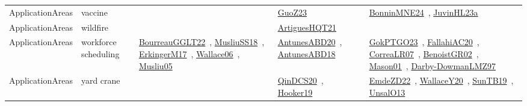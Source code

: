 {\begin{longtable}{lp{3cm}>{\raggedright\arraybackslash}p{6cm}>{\raggedright\arraybackslash}p{6cm}>{\raggedright\arraybackslash}p{8cm}}
\index{vaccine}\index{ApplicationAreas!vaccine}ApplicationAreas & vaccine &  & \href{../works/GuoZ23.pdf}{GuoZ23}~\cite{GuoZ23} & \href{../works/BonninMNE24.pdf}{BonninMNE24}~\cite{BonninMNE24}, \href{../works/JuvinHL23a.pdf}{JuvinHL23a}~\cite{JuvinHL23a}\\
\index{wildfire}\index{ApplicationAreas!wildfire}ApplicationAreas & wildfire &  & \href{../works/ArtiguesHQT21.pdf}{ArtiguesHQT21}~\cite{ArtiguesHQT21} & \\
\index{workforce scheduling}\index{ApplicationAreas!workforce scheduling}ApplicationAreas & workforce scheduling & \href{../works/BourreauGGLT22.pdf}{BourreauGGLT22}~\cite{BourreauGGLT22}, \href{../works/MusliuSS18.pdf}{MusliuSS18}~\cite{MusliuSS18}, \href{../works/ErkingerM17.pdf}{ErkingerM17}~\cite{ErkingerM17}, \href{../works/Wallace06.pdf}{Wallace06}~\cite{Wallace06}, \href{../works/Musliu05.pdf}{Musliu05}~\cite{Musliu05} & \href{../works/AntunesABD20.pdf}{AntunesABD20}~\cite{AntunesABD20}, \href{../works/AntunesABD18.pdf}{AntunesABD18}~\cite{AntunesABD18} & \href{../works/GokPTGO23.pdf}{GokPTGO23}~\cite{GokPTGO23}, \href{../works/FallahiAC20.pdf}{FallahiAC20}~\cite{FallahiAC20}, \href{../works/CorreaLR07.pdf}{CorreaLR07}~\cite{CorreaLR07}, \href{../works/BenoistGR02.pdf}{BenoistGR02}~\cite{BenoistGR02}, \href{../works/Mason01.pdf}{Mason01}~\cite{Mason01}, \href{../works/Darby-DowmanLMZ97.pdf}{Darby-DowmanLMZ97}~\cite{Darby-DowmanLMZ97}\\
\index{yard crane}\index{ApplicationAreas!yard crane}ApplicationAreas & yard crane &  & \href{../works/QinDCS20.pdf}{QinDCS20}~\cite{QinDCS20}, \href{../works/Hooker19.pdf}{Hooker19}~\cite{Hooker19} & \href{../works/EmdeZD22.pdf}{EmdeZD22}~\cite{EmdeZD22}, \href{../works/WallaceY20.pdf}{WallaceY20}~\cite{WallaceY20}, \href{../works/SunTB19.pdf}{SunTB19}~\cite{SunTB19}, \href{../works/UnsalO13.pdf}{UnsalO13}~\cite{UnsalO13}\\
\end{longtable}
}

